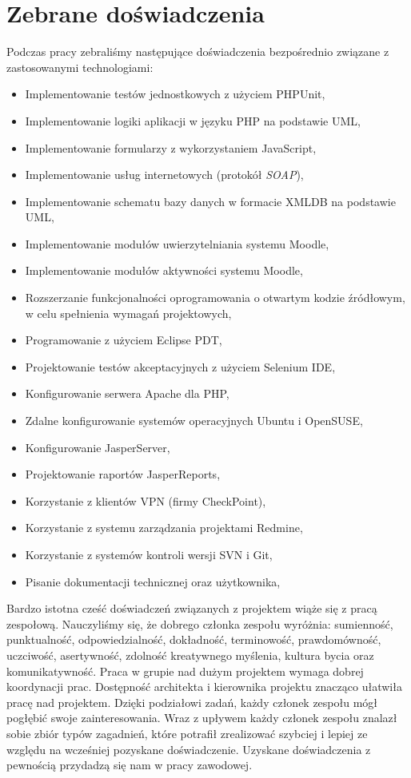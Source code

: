 \chapter{Zebrane doświadczenia}
\label{Chapter8}

Podczas pracy zebraliśmy następujące doświadczenia bezpośrednio związane z zastosowanymi technologiami:
\begin{itemize}
\item{Implementowanie testów jednostkowych z użyciem PHPUnit,}
\item{Implementowanie logiki aplikacji w języku PHP na podstawie UML,}
\item{Implementowanie formularzy z wykorzystaniem JavaScript,}
\item{Implementowanie usług internetowych (protokół \emph{SOAP}),}
\item{Implementowanie schematu bazy danych w formacie XMLDB na podstawie UML,}
\item{Implementowanie modułów uwierzytelniania systemu Moodle,}
\item{Implementowanie modułów aktywności systemu Moodle,}
\item{Rozszerzanie funkcjonalności oprogramowania o otwartym kodzie źródłowym, w celu spełnienia wymagań projektowych,}
\item{Programowanie z użyciem Eclipse PDT,}
\item{Projektowanie testów akceptacyjnych z użyciem Selenium IDE,}
\item{Konfigurowanie serwera Apache dla PHP,}
\item{Zdalne konfigurowanie systemów operacyjnych Ubuntu i OpenSUSE,}
\item{Konfigurowanie JasperServer,}
\item{Projektowanie raportów JasperReports,}
\item{Korzystanie z klientów VPN (firmy CheckPoint),}
\item{Korzystanie z systemu zarządzania projektami Redmine,}
\item{Korzystanie z systemów kontroli wersji SVN i Git,}
\item{Pisanie dokumentacji technicznej oraz użytkownika,}
\end{itemize}

Bardzo istotna cześć doświadczeń związanych z projektem wiąże się z pracą zespołową.
Nauczyliśmy się, że dobrego członka zespołu wyróżnia: sumienność, punktualność, odpowiedzialność, dokładność, terminowość, prawdomówność, uczciwość, asertywność, zdolność kreatywnego myślenia, kultura bycia oraz komunikatywność. Praca w grupie nad dużym projektem wymaga dobrej koordynacji prac. Dostępność architekta i kierownika projektu znacząco ułatwiła pracę nad projektem. Dzięki podziałowi zadań, każdy członek zespołu mógł pogłębić swoje zainteresowania. Wraz z upływem każdy członek zespołu znalazł sobie zbiór typów zagadnień, które potrafił zrealizować szybciej i lepiej ze względu na wcześniej pozyskane doświadczenie. Uzyskane doświadczenia z pewnością przydadzą się nam w pracy zawodowej.